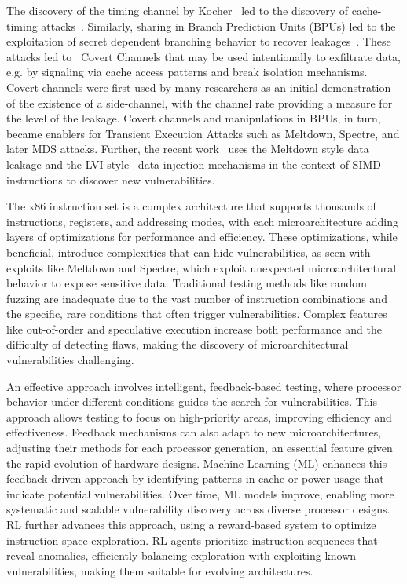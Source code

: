 The discovery of the timing channel by Kocher~\cite{kocher1996timing} led to the discovery of cache-timing attacks~\cite{osvik2006cache}. Similarly, sharing in Branch Prediction Units (BPUs) led to the exploitation of secret dependent branching behavior to recover leakages~\cite{aciiccmez2006predicting}. These attacks led to \Mi\ Covert Channels that may be used intentionally to exfiltrate data, e.g. by signaling via cache access patterns and break isolation mechanisms. Covert-channels were first used by many researchers as an initial demonstration of the existence of a side-channel, with the channel rate providing a measure for the level of the leakage. Covert channels and manipulations in BPUs, in turn, became enablers for Transient Execution Attacks such as Meltdown, Spectre, and later MDS attacks. Further, the recent work~\cite{moghimi2023downfall} uses the Meltdown style data leakage and the LVI style~\cite{vanbulck2020lvi}  data injection mechanisms in the context of SIMD instructions to discover new vulnerabilities.

The x86 instruction set is a complex architecture that supports thousands of instructions, registers, and addressing modes, with each microarchitecture adding layers of optimizations for performance and efficiency. These optimizations, while beneficial, introduce complexities that can hide vulnerabilities, as seen with exploits like Meltdown and Spectre, which exploit unexpected microarchitectural behavior to expose sensitive data.
%
Traditional testing methods like random fuzzing are inadequate due to the vast number of instruction combinations and the specific, rare conditions that often trigger vulnerabilities. Complex features like out-of-order and speculative execution increase both performance and the difficulty of detecting flaws, making the discovery of microarchitectural vulnerabilities challenging.

An effective approach involves intelligent, feedback-based testing, where processor behavior under different conditions guides the search for vulnerabilities. This approach allows testing to focus on high-priority areas, improving efficiency and effectiveness. Feedback mechanisms can also adapt to new microarchitectures, adjusting their methods for each processor generation, an essential feature given the rapid evolution of hardware designs.
%
Machine Learning (ML) enhances this feedback-driven approach by identifying patterns in cache or power usage that indicate potential vulnerabilities. Over time, ML models improve, enabling more systematic and scalable vulnerability discovery across diverse processor designs.
%
RL further advances this approach, using a reward-based system to optimize instruction space exploration. RL agents prioritize instruction sequences that reveal anomalies, efficiently balancing exploration with exploiting known vulnerabilities, making them suitable for evolving architectures.


